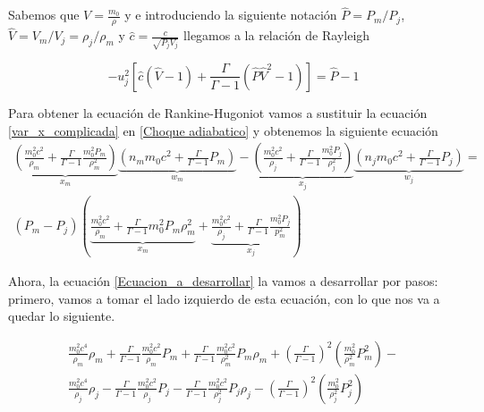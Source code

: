 \documentclass[12pt,a4paper]{book}
\begin{document}
Sabemos que $V = \frac{m_0}{\rho}$ y e introduciendo la siguiente notación $\hat{P}=P_m/P_j$, $\hat{V}=V_m/V_j = \rho_j / \rho_m$ y $\hat{c} = \frac{c}{\sqrt{P_j V_j}}$ llegamos a la relación de Rayleigh

\begin{equation}
-u_j^2
\left[ \hat{c}  \left( \hat{V} - 1 \right)+
\frac{\Gamma}{\Gamma-1} \left( \hat{P} \hat{V}^2 - 1 \right) \right] = 
\hat{P} - 1
\end{equation}

Para obtener la ecuación de Rankine-Hugoniot vamos a sustituir la ecuación \ref{var_x_complicada} en \ref{Choque adiabatico} y obtenemos la siguiente ecuación
\begin{eqnarray}\label{Ecuacion_a_desarrollar}
\underbrace { \left( \frac { m _ { 0 } ^ { 2 } c ^ { 2 } } { \rho _ { m } } + \frac { \Gamma } { \Gamma - 1 } \frac { m _ { 0 } ^ { 2 } P _ { m } } { \rho _ { m } ^ { 2 } } \right) } _ { x _ { m } } \underbrace { \left( n _ { m } m _ { 0 } c ^ { 2 } + \frac { \Gamma } { \Gamma - 1 } P _ { m } \right) } _ { w _ { m } }
- \underbrace { \left( \frac { m _ { 0 } ^ { 2 } c ^ { 2 } } { \rho _ { j } } + \frac { \Gamma } { \Gamma - 1 } \frac { m _ { 0 } ^ { 2 } P _ { j } } { \rho _ { j } ^ { 2 } } \right) } _ { x _ { j } } \underbrace { \left( n _ { j } m _ { 0 } c ^ { 2 } + \frac { \Gamma } { \Gamma - 1 } P _ { j } \right) } _ { w _ { j } } = \nonumber \\ 
\left( P _ { m } - P _ { j } \right) \left( \underbrace { \frac { m _ { 0 } ^ { 2 } c ^ { 2 } } { \rho _ { m } } + \frac { \Gamma } { \Gamma - 1 }  { m _ { 0 } ^ { 2 } P _ { m } } { \rho _ { m } ^ { 2 } } } _ { x _ { m } } + \underbrace { \frac { m _ { 0 } ^ { 2 } c ^ { 2 } } { \rho _ { j } } + \frac { \Gamma } { \Gamma - 1 } \frac { m _ { 0 } ^ { 2 } P _ { j } } { p _ { m } ^ { 2 } } } _ { x _ { j } } \right)
\end{eqnarray}

Ahora, la ecuación \ref{Ecuacion_a_desarrollar} la vamos a desarrollar por pasos: primero, vamos a tomar el lado izquierdo de esta ecuación, con lo que nos va a quedar lo siguiente.

\begin{eqnarray}\label{side_left}
\frac { m _ { 0 } ^ { 2 } c ^ { 4 } } { \rho _ { m } } \rho _ { m } + \frac { \Gamma } { \Gamma - 1 } \frac { m _ { 0 } ^ { 2 } c ^ { 2 } } { \rho _ { m } } P _ { m } +
\frac { \Gamma } { \Gamma - 1 } \frac { m _ { 0 } ^ { 2 } c ^ { 2 } } { \rho _ { m } ^ { 2 } } P _ { m } \rho _ { m } + \left( \frac { \Gamma } { \Gamma - 1 } \right) ^ { 2 } \left( \frac { m _ { 0 } ^ { 2 } } { \rho _ { m } ^ { 2 } } P _ { m } ^ { 2 } \right)- \nonumber \\
 \frac { m _ { 0 } ^ { 2 } c ^ { 4 } } { \rho _ { j } } \rho _ { j } - \frac { \Gamma } { \Gamma - 1 } \frac { m _ { 0 } ^ { 2 } c ^ { 2 } } { \rho _ { j } } P _ { j }
 - \frac { \Gamma } { \Gamma - 1 } \frac { m _ { 0 } ^ { 2 } c ^ { 2 } } { \rho _ { j } ^ { 2 } } P _ { j } \rho _ { j } - \left( \frac { \Gamma } { \Gamma - 1 } \right) ^ { 2 } \left( \frac { m _ { 0 } ^ { 2 } } { \rho _ { j } ^ { 2 } } P _ { j } ^ { 2 } \right)
\end{eqnarray}
\end{document}
